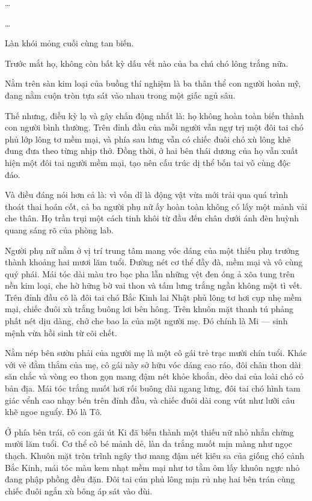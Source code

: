 \documentclass[../main.tex]{subfiles}
\begin{document}
\dots

\dots

Làn khói mỏng cuối cùng tan biến.

Trước mắt họ, không còn bất kỳ dấu vết nào của ba chú chó lông trắng nữa.

Nằm trên sàn kim loại của buồng thí nghiệm là ba thân thể con người hoàn mỹ, đang nằm cuộn tròn tựa sát vào nhau trong một giấc ngủ sâu.

Thế nhưng, điều kỳ lạ và gây chấn động nhất là: họ không hoàn toàn biến thành con người bình thường. Trên đỉnh đầu của mỗi người vẫn ngự trị một đôi tai chó phủ lớp lông tơ mềm mại, và phía sau lưng vẫn có chiếc đuôi chó xù lông khẽ đung đưa theo từng nhịp thở. Đồng thời, ở hai bên thái dương của họ vẫn xuất hiện một đôi tai người mềm mại, tạo nên cấu trúc dị thể bốn tai vô cùng độc đáo.

Và điều đáng nói hơn cả là: vì vốn dĩ là động vật vừa mới trải qua quá trình thoát thai hoán cốt, cả ba người phụ nữ ấy hoàn toàn không có lấy một mảnh vải che thân. Họ trần trụi một cách tinh khôi từ đầu đến chân dưới ánh đèn huỳnh quang sáng rõ của phòng lab.

Người phụ nữ nằm ở vị trí trung tâm mang vóc dáng của một thiếu phụ trưởng thành khoảng hai mươi lăm tuổi. Đường nét cơ thể đẫy đà, mềm mại và vô cùng quý phái. Mái tóc dài màu tro bạc pha lẫn những vệt đen óng ả xõa tung trên nền kim loại, che hờ hững bờ vai thon và tấm lưng trắng ngần không một tì vết. Trên đỉnh đầu cô là đôi tai chó Bắc Kinh lai Nhật phủ lông tơ hơi cụp nhẹ mềm mại, chiếc đuôi xù trắng buông lơi bên hông. Trên khuôn mặt thanh tú phảng phất nét dịu dàng, chở che bao la của một người mẹ. Đó chính là Mi — sinh mệnh vừa hồi sinh từ cõi chết.

Nằm nép bên sườn phải của người mẹ là một cô gái trẻ trạc mười chín tuổi. Khác với vẻ đằm thắm của mẹ, cô gái này sở hữu vóc dáng cao ráo, đôi chân thon dài săn chắc và vòng eo thon gọn mang đậm nét khỏe khoắn, dẻo dai của loài chó cỏ bản địa. Mái tóc trắng muốt hơi rối buông dài ngang lưng, đôi tai chó hình tam giác vểnh cao nhạy bén trên đỉnh đầu, và chiếc đuôi dài cong vút như lưỡi câu khẽ ngoe nguẩy. Đó là Tô.

Ở phía bên trái, cô con gái út Ki đã biến thành một thiếu nữ nhỏ nhắn chừng mười lăm tuổi. Cơ thể cô bé mảnh dẻ, làn da trắng muốt mịn màng như ngọc thạch. Khuôn mặt tròn trĩnh ngây thơ mang đậm nét kiêu sa của giống chó cảnh Bắc Kinh, mái tóc màu kem nhạt mềm mại như tơ tằm ôm lấy khuôn ngực nhỏ đang phập phồng đều đặn. Đôi tai cún phủ lông mịn rủ nhẹ hai bên trán cùng chiếc đuôi ngắn xù bông áp sát vào đùi.
\end{document}

